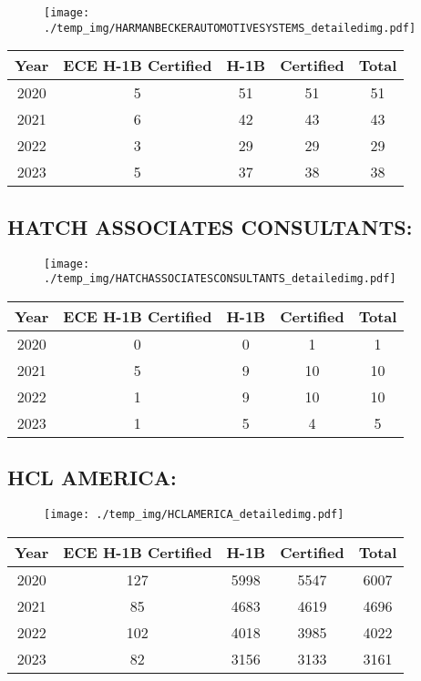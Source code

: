 \documentclass{article}%
\begin{document}
\begin{figure}[htbp]%
\centering%
\texttt{[image: ./temp\_img/HARMANBECKERAUTOMOTIVESYSTEMS\_detailedimg.pdf]}%
\end{figure}

%
\begin{longtable}{c|c|c|c|c}%
\hline%
Year&ECE H{-}1B Certified&H{-}1B&Certified&Total\\%
\hline%
2020&5&51&51&51\\%
\hline%
2021&6&42&43&43\\%
\hline%
2022&3&29&29&29\\%
\hline%
2023&5&37&38&38\\%
\hline%
\end{longtable}

%
\newpage%
\subsection{HATCH ASSOCIATES CONSULTANTS:}%
\label{subsec:HATCHASSOCIATESCONSULTANTS}%
\label{HATCHASSOCIATESCONSULTANTSdetailed}%


\begin{figure}[htbp]%
\centering%
\texttt{[image: ./temp\_img/HATCHASSOCIATESCONSULTANTS\_detailedimg.pdf]}%
\end{figure}

%
\begin{longtable}{c|c|c|c|c}%
\hline%
Year&ECE H{-}1B Certified&H{-}1B&Certified&Total\\%
\hline%
2020&0&0&1&1\\%
\hline%
2021&5&9&10&10\\%
\hline%
2022&1&9&10&10\\%
\hline%
2023&1&5&4&5\\%
\hline%
\end{longtable}

%
\newpage%
\subsection{HCL AMERICA:}%
\label{subsec:HCLAMERICA}%
\label{HCLAMERICAdetailed}%


\begin{figure}[htbp]%
\centering%
\texttt{[image: ./temp\_img/HCLAMERICA\_detailedimg.pdf]}%
\end{figure}

%
\begin{longtable}{c|c|c|c|c}%
\hline%
Year&ECE H{-}1B Certified&H{-}1B&Certified&Total\\%
\hline%
2020&127&5998&5547&6007\\%
\hline%
2021&85&4683&4619&4696\\%
\hline%
2022&102&4018&3985&4022\\%
\hline%
2023&82&3156&3133&3161\\%
\hline%
\end{longtable}
\end{document}
